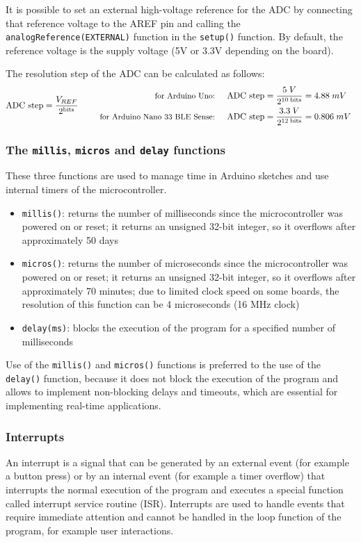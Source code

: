 It is possible to set an external high-voltage reference for the ADC by connecting that reference voltage to the AREF pin and
calling the \texttt{analogReference(EXTERNAL)} function in the \texttt{setup()} function. By default, the reference voltage is
the supply voltage (5V or 3.3V depending on the board).

The resolution step of the ADC can be calculated as follows:
\[\text{ADC step} = \frac{V_{REF}}{2^{\text{bits}}} \qquad \begin{array}{r l}
	\text{\small for Arduino Uno: } & \displaystyle \text{ADC step} = \frac{5 \; V}{2^{10 \; \text{bits}}} = 4.88 \; mV \\[7pt]
	\text{\small for Arduino Nano 33 BLE Sense: } & \displaystyle \text{ADC step} = \frac{3.3 \; V}{2^{12 \; \text{bits}}} = 0.806 \; mV
\end{array}\]

\subsubsection*{The \texttt{millis}, \texttt{micros} and \texttt{delay} functions}
These three functions are used to manage time in Arduino sketches and use internal timers of the microcontroller.
\begin{itemize}
	\item \texttt{millis()}: returns the number of milliseconds since the microcontroller was powered on or reset;
	it returns an unsigned 32-bit integer, so it overflows after approximately 50 days
	\item \texttt{micros()}: returns the number of microseconds since the microcontroller was powered on or reset;
	it returns an unsigned 32-bit integer, so it overflows after approximately 70 minutes; due to limited clock speed
	on some boards, the resolution of this function can be 4 microseconds (16 MHz clock)
	\item \texttt{delay(ms)}: blocks the execution of the program for a specified number of milliseconds
\end{itemize}

\noindent
Use of the \texttt{millis()} and \texttt{micros()} functions is preferred to the use of the \texttt{delay()} function,
because it does not block the execution of the program and allows to implement non-blocking delays and timeouts, which
are essential for implementing real-time applications.

\subsubsection*{Interrupts}
An interrupt is a signal that can be generated by an external event (for example a button press) or by an internal event
(for example a timer overflow) that interrupts the normal execution of the program and executes a special function called
interrupt service routine (ISR). Interrupts are used to handle events that require immediate attention and cannot be handled
in the loop function of the program, for example user interactions.

